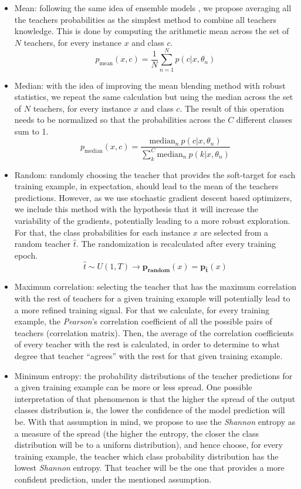 \documentclass{elsarticle}
\begin{document}
	 \begin{itemize}
	 	\item Mean: following the same idea of ensemble models \cite{kuncheva2004}, we propose averaging all the teachers probabilities as the simplest method to combine all teachers knowledge. This is done by computing the arithmetic mean across the set of $N$ teachers, for every instance $x$ and class $c$.
	 	$$p_{\text{mean}}(x, c) = \frac{1}{N} \sum_{n=1}^N p(c | x, \theta_n)$$
	 	\item Median: with the idea of improving the mean blending method with robust statistics, we repeat the same calculation but using the median across the set of $N$ teachers, for every instance $x$ and class $c$. The result of this operation needs to be normalized so that the probabilities across the $C$ different classes sum to 1. $$p_{\text{median}}(x, c) = \frac{\text{median}_n\ p(c | x, \theta_n) }{ \sum_{k}^{C} \text{median}_n\  p(k | x, \theta_n)}  $$
	 	\item Random: randomly choosing the teacher that provides the soft-target for each training example, in expectation, should lead to the mean of the teachers predictions. However, as we use stochastic gradient descent based optimizers, we include this method with the hypothesis that it will increase the variability of the gradients, potentially leading to a more robust exploration. For that, the class probabilities for each instance $x$ are selected from a random teacher $\hat{t}$. The randomization is recalculated after every training epoch.
	 	$$\hat{t} \sim U(1, T) \rightarrow \mathbf{p_\text{random}}(x) = \mathbf{p_{\hat{t}}}(x)$$
	 	\item Maximum correlation: selecting the teacher that has the maximum correlation with the rest of teachers for a given training example will potentially lead to a more refined training signal. For that we calculate, for every training example, the \textit{Pearson}'s correlation coefficient of all the possible pairs of teachers (correlation matrix). Then, the average of the correlation coefficients of every teacher with the rest is calculated, in order to determine to what degree that teacher ``agrees'' with the rest for that given training example. 
	 	\item Minimum entropy: the probability distributions of the teacher predictions for a given training example can be more or less spread. One possible interpretation of that phenomenon is that the higher the spread of the output classes distribution is, the lower the confidence of the model prediction will be. With that assumption in mind, we propose to use the \textit{Shannon} entropy as a measure of the spread (the higher the entropy, the closer the class distribution will be to a uniform distribution), and hence choose, for every training example, the teacher which class probability distribution has the lowest \textit{Shannon} entropy. That teacher will be the one that provides a more confident prediction, under the mentioned assumption.
 	\end{itemize}
 
\end{document}

